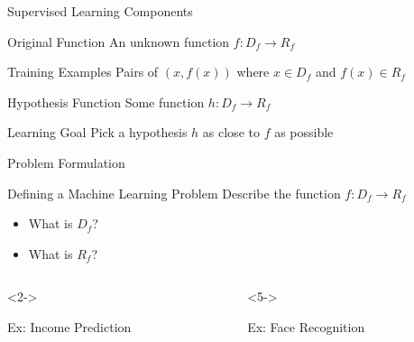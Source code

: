 \documentclass[14pt]{beamer}
\begin{document}
\begin{frame}{Supervised Learning Components}
\begin{block}{Original Function}
An unknown function $f\!: D_f \rightarrow R_f$
\end{block}
\pause
\begin{block}{Training Examples}
Pairs of $(x, f(x))$ where $x \in D_f$ and $f(x) \in R_f$
\end{block}
\pause
\begin{block}{Hypothesis Function}
Some function $h\!: D_f \rightarrow R_f$
\end{block}
\pause
\begin{block}{Learning Goal}
Pick a hypothesis $h$ as close to $f$ as possible
\end{block}
\end{frame}

\begin{frame}{Problem Formulation}
\begin{block}{Defining a Machine Learning Problem}
Describe the function $f\!: D_f \rightarrow R_f$
\begin{itemize}
\item What is $D_f$?
\item What is $R_f$?
\end{itemize}
\end{block}
\begin{columns}
\begin{column}{0.47\textwidth}<2->
\begin{block}{Ex: Income Prediction}
\begin{description}[$D_f =$]
\item[$D_f =$] 
\item[$R_f =$] 
\end{description}
\end{block}
\end{column}
\begin{column}{0.47\textwidth}<5->
\begin{block}{Ex: Face Recognition}
\begin{description}[$D_f =$]
\item[$D_f =$] 
\item[$R_f =$] 
\end{description}
\end{block}
\end{column}
\end{columns}
\end{frame}
\end{document}
